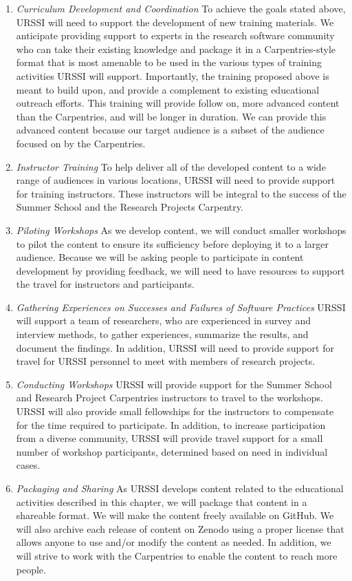 \documentclass[
]{book}
\begin{document}
\begin{enumerate}
\def\labelenumi{\arabic{enumi}.}
\item
  \emph{Curriculum Development and Coordination}
  To achieve the goals stated above, URSSI will need to support the development of new
  training materials. We anticipate providing support to experts in the research software
  community who can take their existing knowledge and package it in a Carpentries-style
  format that is most amenable to be used in the various types of training activities URSSI
  will support. Importantly, the training proposed above is meant to build upon, and
  provide a complement to existing educational outreach efforts. This training will provide
  follow on, more advanced content than the Carpentries, and will be longer in duration.
  We can provide this advanced content because our target audience is a subset of the audience
  focused on by the Carpentries.
\item
  \emph{Instructor Training}
  To help deliver all of the developed content to a wide range of audiences in various
  locations, URSSI will need to provide support for training instructors. These instructors
  will be integral to the success of the Summer School and the Research Projects Carpentry.
\item
  \emph{Piloting Workshops}
  As we develop content, we will conduct smaller workshops to pilot the content to ensure
  its sufficiency before deploying it to a larger audience. Because we will be asking people
  to participate in content development by providing feedback, we will need to have resources
  to support the travel for instructors and participants.
\item
  \emph{Gathering Experiences on Successes and Failures of Software Practices}
  URSSI will support a team of researchers, who are experienced in survey and interview methods,
  to gather experiences, summarize the results, and document the findings. In addition, URSSI will
  need to provide support for travel for URSSI personnel to meet with members of research projects.
\item
  \emph{Conducting Workshops}
  URSSI will provide support for the Summer School and Research Project Carpentries instructors
  to travel to the workshops. URSSI will also provide small fellowships for the instructors
  to compensate for the time required to participate. In addition, to increase participation
  from a diverse community, URSSI will provide travel support for a small number of workshop
  participants, determined based on need in individual cases.
\item
  \emph{Packaging and Sharing}
  As URSSI develops content related to the educational activities described in this chapter, we
  will package that content in a shareable format. We will make the content freely
  available on GitHub. We will also archive each release of content on Zenodo using a proper
  license that allows anyone to use and/or modify the content as needed. In addition, we will
  strive to work with the Carpentries to enable the content to reach more people.
\end{enumerate}
\end{document}
